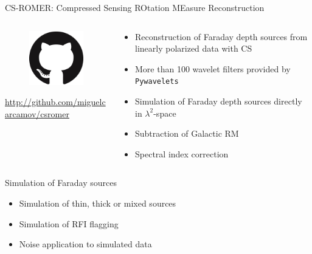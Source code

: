 \documentclass[xetex,aspectratio=169]{beamer}
\begin{document}
\begin{frame}{CS-ROMER: Compressed Sensing ROtation MEasure Reconstruction}
	\begin{columns}[onlytextwidth,t]
		\begin{column}{.5\textwidth}
			\begin{figure}
				\centering
				\includegraphics[scale=0.5]{figures/logos/GitHub-Mark-120px-plus.png}
			\end{figure}

			\url{http://github.com/miguelcarcamov/csromer}
		\end{column}
		\begin{column}{.5\textwidth}
			\begin{itemize}
				\item Reconstruction of Faraday depth sources from linearly polarized data with CS
				\item More than 100 wavelet filters provided by {\tt Pywavelets}
				\item Simulation of Faraday depth sources directly in $\lambda^2$-space
				\item Subtraction of Galactic RM
				\item Spectral index correction
			\end{itemize}
		\end{column}%

	\end{columns}
\end{frame}

\begin{frame}{Simulation of Faraday sources}
	\begin{itemize}
		\item Simulation of thin, thick or mixed sources
		\item Simulation of RFI flagging
		\item Noise application to simulated data
	\end{itemize}

\end{frame}
\end{document}
